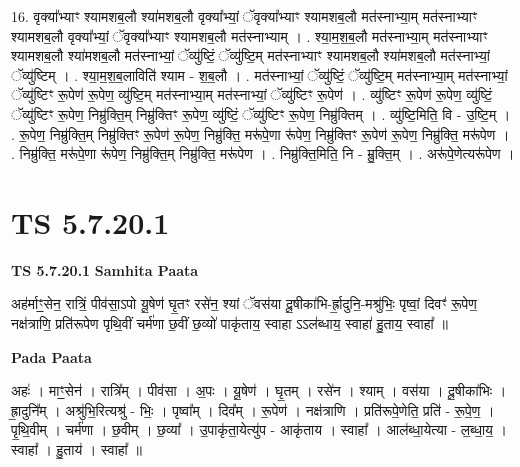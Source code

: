 \documentclass[17pt]{extarticle}
\begin{document}
16. वृक्या᳚भ्याꣳ श्यामशब॒लौ श्या॑मशब॒लौ वृक्या᳚भ्यां॒ ॅवृक्या᳚भ्याꣳ श्यामशब॒लौ मत॑स्नाभ्या॒म् मत॑स्नाभ्याꣳ श्यामशब॒लौ वृक्या᳚भ्यां॒ ॅवृक्या᳚भ्याꣳ श्यामशब॒लौ मत॑स्नाभ्याम् । . श्या॒म॒श॒ब॒लौ मत॑स्नाभ्या॒म् मत॑स्नाभ्याꣳ श्यामशब॒लौ श्या॑मशब॒लौ मत॑स्नाभ्यां॒ ॅव्यु॑ष्टिं॒ ॅव्यु॑ष्टि॒म् मत॑स्नाभ्याꣳ श्यामशब॒लौ श्या॑मशब॒लौ मत॑स्नाभ्यां॒ ॅव्यु॑ष्टिम् । . श्या॒म॒श॒ब॒लाविति॑ श्याम - श॒ब॒लौ । . मत॑स्नाभ्यां॒ ॅव्यु॑ष्टिं॒ ॅव्यु॑ष्टि॒म् मत॑स्नाभ्या॒म् मत॑स्नाभ्यां॒ ॅव्यु॑ष्टिꣳ रू॒पेण॑ रू॒पेण॒ व्यु॑ष्टि॒म् मत॑स्नाभ्या॒म् मत॑स्नाभ्यां॒ ॅव्यु॑ष्टिꣳ रू॒पेण॑ । . व्यु॑ष्टिꣳ रू॒पेण॑ रू॒पेण॒ व्यु॑ष्टिं॒ ॅव्यु॑ष्टिꣳ रू॒पेण॒ निम्रु॑क्ति॒म् निम्रु॑क्तिꣳ रू॒पेण॒ व्यु॑ष्टिं॒ ॅव्यु॑ष्टिꣳ रू॒पेण॒ निम्रु॑क्तिम् । . व्यु॑ष्टि॒मिति॒ वि - उ॒ष्टि॒म् । . रू॒पेण॒ निम्रु॑क्ति॒म् निम्रु॑क्तिꣳ रू॒पेण॑ रू॒पेण॒ निम्रु॑क्ति॒ मरू॑पे॒णा रू॑पेण॒ निम्रु॑क्तिꣳ रू॒पेण॑ रू॒पेण॒ निम्रु॑क्ति॒ मरू॑पेण । . निम्रु॑क्ति॒ मरू॑पे॒णा रू॑पेण॒ निम्रु॑क्ति॒म् निम्रु॑क्ति॒ मरू॑पेण । . निम्रु॑क्ति॒मिति॒ नि - म्रु॒क्ति॒म् । . अरू॑पे॒णेत्यरू॑पेण । \newline
\pagebreak
{}

\section{ TS 5.7.20.1 }

\textbf{TS 5.7.20.1 } \newline
\textbf{Samhita Paata} \newline

अह॑र्माꣳ॒॒सेन॒ रात्रिं॒ पीव॑सा॒ऽपो यू॒षेण॑ घृ॒तꣳ रसे॑न॒ श्यां ॅवस॑या दू॒षीका॑भि-र्ह्रा॒दुनि॒-मश्रु॑भिः॒ पृष्वां॒ दिवꣳ॑ रू॒पेण॒ नक्ष॑त्राणि॒ प्रति॑रूपेण पृथि॒वीं चर्म॑णा छ॒वीं छ॒व्यो॑ पाकृ॑ताय॒ स्वाहा ऽऽल॑ब्धाय॒ स्वाहा॑ हु॒ताय॒ स्वाहा᳚ ॥ \newline

\textbf{Pada Paata} \newline

अहः॑ । माꣳ॒॒सेन॑ । रात्रि᳚म् । पीव॑सा । अ॒पः । यू॒षेण॑ । घृ॒तम् । रसे॑न । श्याम् । वस॑या । दू॒षीका॑भिः । ह्रा॒दुनि᳚म् । अश्रु॑भि॒रित्यश्रु॑ - भिः॒ । पृष्वा᳚म् । दिव᳚म् । रू॒पेण॑ । नक्ष॑त्राणि । प्रति॑रूपे॒णेति॒ प्रति॑ - रू॒पे॒ण॒ । पृ॒थि॒वीम् । चर्म॑णा । छ॒वीम् । छ॒व्या᳚ । उ॒पाकृ॑ता॒येत्यु॑प - आकृ॑ताय । स्वाहा᳚ । आल॑ब्धा॒येत्या - ल॒ब्धा॒य॒ । स्वाहा᳚ । हु॒ताय॑ । स्वाहा᳚ ॥  \newline
\end{document}
